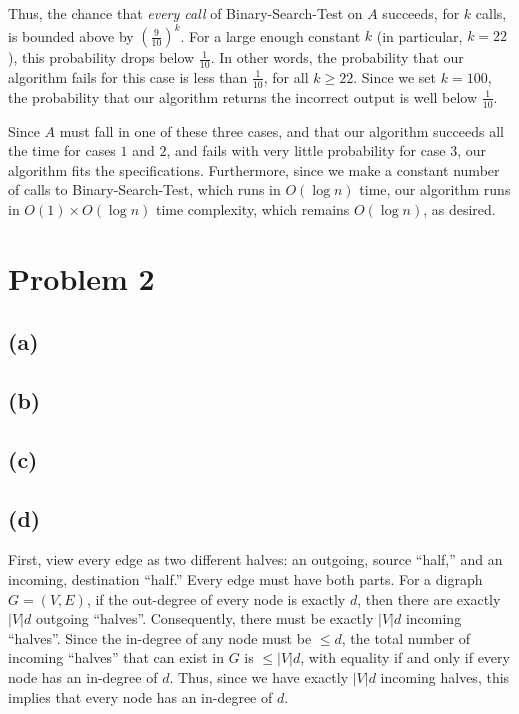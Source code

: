 \documentclass{6046}
\begin{document}
Thus, the chance that {\it every call} of
{\sc Binary-Search-Test} on $A$ succeeds, for $k$ calls,
is bounded above by $(\frac{9}{10})^k$. For a large
enough constant $k$ (in particular, $k = 22$), this probability
drops below $\frac{1}{10}$. In other words, the probability that
our algorithm fails for this case is less than $\frac{1}{10}$,
for all $k \ge 22$. Since we set $k = 100$, the probability that
our algorithm returns the incorrect output is well below $\frac{1}{10}$.

\vspace{1.5em}

Since $A$ must fall in one of these three cases,
and that our algorithm succeeds all the time
for cases $1$ and $2$, and fails
with very little probability for case $3$,
our algorithm fits the specifications. Furthermore,
since we make a constant number of calls to {\sc Binary-Search-Test},
which runs in $O(\log n)$ time, our algorithm runs in
$O(1) \times O(\log n)$ time complexity, which remains $O(\log n)$,
as desired.

\section*{Problem 2}
\subsection*{(a)}

\subsection*{(b)}

\subsection*{(c)}

\subsection*{(d)}
First, view every edge as two different halves: an outgoing, source
``half,'' and an incoming, destination ``half.'' Every
edge must have both parts. For a digraph
$G = (V, E)$, if the out-degree of every node is
exactly $d$, then there are exactly $|V|d$ outgoing ``halves''.
Consequently, there must be exactly $|V|d$ incoming ``halves''.
Since the in-degree of any node must be $\le d$, the
total number of incoming ``halves'' that can exist in $G$
is $\le |V|d$, with equality if and only if every node has
an in-degree of $d$. Thus, since we have exactly $|V|d$ incoming
halves, this implies that every node has an in-degree of $d$.
\end{document}
